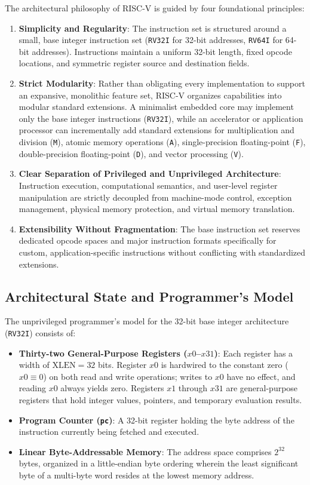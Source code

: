 The architectural philosophy of RISC-V is guided by four foundational principles:
\begin{enumerate}
    \item \textbf{Simplicity and Regularity}: The instruction set is structured around a small, base integer instruction set (\texttt{RV32I} for 32-bit addresses, \texttt{RV64I} for 64-bit addresses). Instructions maintain a uniform 32-bit length, fixed opcode locations, and symmetric register source and destination fields.
    \item \textbf{Strict Modularity}: Rather than obligating every implementation to support an expansive, monolithic feature set, RISC-V organizes capabilities into modular standard extensions. A minimalist embedded core may implement only the base integer instructions (\texttt{RV32I}), while an accelerator or application processor can incrementally add standard extensions for multiplication and division (\texttt{M}), atomic memory operations (\texttt{A}), single-precision floating-point (\texttt{F}), double-precision floating-point (\texttt{D}), and vector processing (\texttt{V}).
    \item \textbf{Clear Separation of Privileged and Unprivileged Architecture}: Instruction execution, computational semantics, and user-level register manipulation are strictly decoupled from machine-mode control, exception management, physical memory protection, and virtual memory translation.
    \item \textbf{Extensibility Without Fragmentation}: The base instruction set reserves dedicated opcode spaces and major instruction formats specifically for custom, application-specific instructions without conflicting with standardized extensions.
\end{enumerate}

\subsection{Architectural State and Programmer's Model}

The unprivileged programmer's model for the 32-bit base integer architecture (\texttt{RV32I}) consists of:
\begin{itemize}
    \item \textbf{Thirty-two General-Purpose Registers ($x0$--$x31$)}: Each register has a width of $\text{XLEN} = 32$ bits. Register $x0$ is hardwired to the constant zero ($x0 \equiv 0$) on both read and write operations; writes to $x0$ have no effect, and reading $x0$ always yields zero. Registers $x1$ through $x31$ are general-purpose registers that hold integer values, pointers, and temporary evaluation results.
    \item \textbf{Program Counter (\texttt{pc})}: A 32-bit register holding the byte address of the instruction currently being fetched and executed.
    \item \textbf{Linear Byte-Addressable Memory}: The address space comprises $2^{32}$ bytes, organized in a little-endian byte ordering wherein the least significant byte of a multi-byte word resides at the lowest memory address.
\end{itemize}

